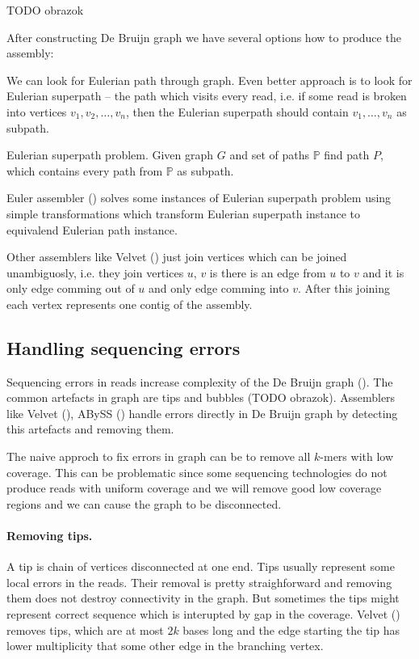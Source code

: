 TODO obrazok

After constructing De Bruijn graph we have several options how to produce the assembly:

We can look for Eulerian path through graph. Even better approach is to look for
Eulerian superpath -- the path which visits every read, i.e. if some read
is broken into vertices $v_1, v_2, \dots, v_n$, then the Eulerian superpath
should contain $v_1, \dots, v_n$ as subpath.

\begin{definition}{Eulerian superpath problem.}
Given graph $G$ and set of paths $\mathbb{P}$ find path $P$, which contains
every path from $\mathbb{P}$ as subpath.
\end{definition}

Euler assembler (\cite{pevzner2001eulerian}) solves some instances of Eulerian superpath problem
using simple transformations which transform Eulerian superpath instance to equivalend Eulerian path instance.

Other assemblers like Velvet (\cite{Velvet}) just join vertices which can be joined
unambiguosly, i.e. they join vertices $u$, $v$ is there is an edge from $u$ to $v$ and
it is only edge comming out of $u$ and only edge comming into $v$. After this joining
each vertex represents one contig of the assembly.

\subsection{Handling sequencing errors}

Sequencing errors in reads increase complexity of the De Bruijn graph
(\cite{pevzner2001eulerian}). The common artefacts in graph are tips and bubbles
(TODO obrazok). Assemblers like Velvet (\cite{Velvet}), ABySS (\cite{Abyss}) handle
errors directly in De Bruijn graph by detecting this artefacts and removing them.

The naive approch to fix errors in graph can be to remove all $k$-mers with low coverage.
This can be problematic since some sequencing technologies do not produce reads with uniform coverage
and we will remove good low coverage regions and we can cause the graph to be disconnected.

\paragraph{Removing tips.} A tip is chain of vertices disconnected at one end. 
Tips usually represent some local errors in the reads. Their removal is pretty straighforward
and removing them does not destroy connectivity in the graph. But sometimes the tips
might represent correct sequence which is interupted by gap in the coverage.
Velvet (\cite{Velvet}) removes tips, which are at most $2k$ bases long and the edge starting
the tip has lower multiplicity that some other edge in the branching vertex.


